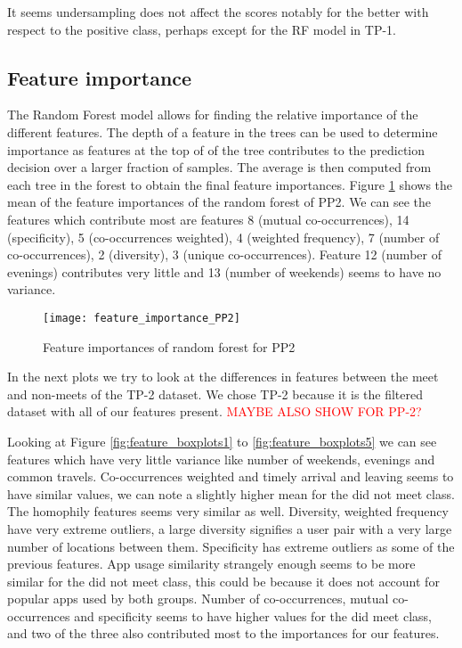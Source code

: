 It seems undersampling does not affect the scores notably for the better with respect to the positive class, perhaps except for the RF model in TP-1.

\subsection{Feature importance}
The Random Forest model allows for finding the relative importance of the different features. The depth of a feature in the trees can be used to determine importance as features at the top of of the tree contributes to the prediction decision over a larger fraction of samples. The average is then computed from each tree in the forest to obtain the final feature importances.
Figure \ref{fig:feature_importances} shows the mean of the feature importances of the random forest of PP2. We can see the features which contribute most are features 8 (mutual co-occurrences), 14 (specificity), 5 (co-occurrences weighted), 4 (weighted frequency), 7 (number of co-occurrences), 2 (diversity), 3 (unique co-occurrences). Feature 12 (number of evenings) contributes very little and 13 (number of weekends) seems to have no variance.
\begin{figure}[H]
    \hspace*{-1.0cm}
    \centering
    \texttt{[image: feature\_importance\_PP2]}
    \caption{Feature importances of random forest for PP2}
    \label{fig:feature_importances}
\end{figure}

In the next plots we try to look at the differences in features between the meet and non-meets of the TP-2 dataset. We chose TP-2 because it is the filtered dataset with all of our features present. \textcolor{red}{MAYBE ALSO SHOW FOR PP-2?}

Looking at Figure \ref{fig:feature_boxplots1} to \ref{fig:feature_boxplots5} we can see features which have very little variance like number of weekends, evenings and common travels. Co-occurrences weighted and timely arrival and leaving seems to have similar values, we can note a slightly higher mean for the did not meet class. The homophily features seems very similar as well. Diversity, weighted frequency have very extreme outliers, a large diversity signifies a user pair with a very large number of locations between them. Specificity has extreme outliers as some of the previous features. App usage similarity strangely enough seems to be more similar for the did not meet class, this could be because it does not account for popular apps used by both groups. Number of co-occurrences, mutual co-occurrences and specificity seems to have higher values for the did meet class, and two of the three also contributed most to the importances for our features.

